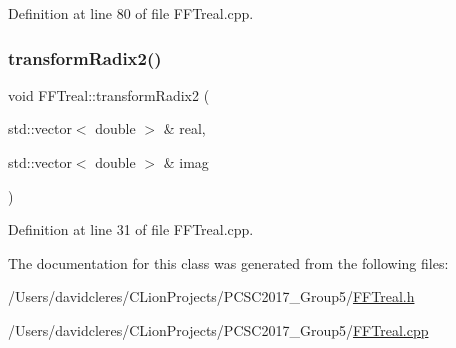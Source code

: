 Definition at line 80 of file F\+F\+Treal.\+cpp.

\mbox{\label{class_f_f_treal_afa3f0e3c25513ee26c9698b864330df9}} 
\subsubsection{\texorpdfstring{transform\+Radix2()}{transformRadix2()}}
{\footnotesize\ttfamily void F\+F\+Treal\+::transform\+Radix2 (\begin{DoxyParamCaption}\item[{std\+::vector$<$ double $>$ \&}]{real,  }\item[{std\+::vector$<$ double $>$ \&}]{imag }\end{DoxyParamCaption})}



Definition at line 31 of file F\+F\+Treal.\+cpp.



The documentation for this class was generated from the following files\+:\begin{DoxyCompactItemize}
\item 
/\+Users/davidcleres/\+C\+Lion\+Projects/\+P\+C\+S\+C2017\+\_\+\+Group5/\mbox{\hyperlink{_f_f_treal_8h}{F\+F\+Treal.\+h}}\item 
/\+Users/davidcleres/\+C\+Lion\+Projects/\+P\+C\+S\+C2017\+\_\+\+Group5/\mbox{\hyperlink{_f_f_treal_8cpp}{F\+F\+Treal.\+cpp}}\end{DoxyCompactItemize}
